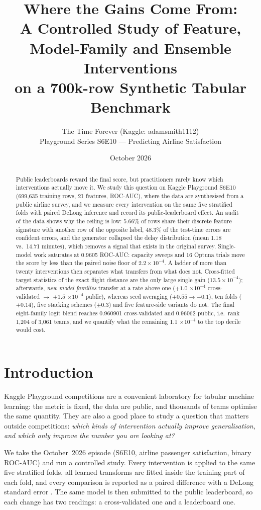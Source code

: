 \documentclass[10pt,a4paper]{article}
\title{\vspace{-1.2cm}\bfseries Where the Gains Come From:\\[2pt]
\large A Controlled Study of Feature, Model-Family and Ensemble Interventions\\
on a 700k-row Synthetic Tabular Benchmark}
\author{The Time Forever \quad (Kaggle: \textsf{adamsmith1112})\\[2pt]
\small Playground Series S6E10 --- Predicting Airline Satisfaction}
\date{October 2026}
\newcommand{\auc}{ROC-AUC}
\newcommand{\dlt}[1]{$#1\times10^{-4}$}
\begin{document}
\maketitle

\begin{abstract}
\noindent
Public leaderboards reward the final score, but practitioners rarely know which
interventions actually move it. We study this question on Kaggle Playground S6E10
(699{,}635 training rows, 21 features, \auc{}), where the data are synthesised from a
public airline survey, and we measure every intervention on the same five stratified folds
with paired DeLong inference and record its public-leaderboard effect. An audit of the data
shows why the ceiling is low: 5.66\% of rows share their discrete feature signature with
another row of the opposite label, 48.3\% of the test-time errors are confident errors, and
the generator collapsed the delay distribution (mean 1.18 vs.\ 14.71 minutes), which removes a
signal that exists in the original survey. Single-model work saturates at 0.9605
\auc{}: capacity sweeps and 16 Optuna trials move the score by less than the paired noise
floor of \dlt{2.2}. A ladder of more than twenty interventions then separates what transfers from what does
not. Cross-fitted target statistics of the exact flight distance are the only large single
gain (\dlt{13.5}); afterwards, \emph{new model families} transfer at a rate above one
($+1.0$ \dlt{} cross-validated $\to$ $+1.5$ \dlt{} public), whereas seed averaging
($+0.55 \to +0.1$), ten folds ($+0.14$), five stacking schemes ($\pm 0.3$) and five
feature-side variants do not. The final eight-family logit blend reaches 0.960901
cross-validated and 0.96062 public, i.e.\ rank 1{,}204 of 3{,}061 teams, and we quantify what
the remaining 1.1 \dlt{} to the top decile would cost.
\end{abstract}

\section{Introduction}

Kaggle Playground competitions are a convenient laboratory for tabular machine learning:
the metric is fixed, the data are public, and thousands of teams optimise the same quantity.
They are also a good place to study a question that matters outside competitions:
\emph{which kinds of intervention actually improve generalisation, and which only improve the
number you are looking at?}

We take the October~2026 episode (S6E10, airline passenger satisfaction, binary \auc{}) and run
a controlled study. Every intervention is applied to the same five stratified folds, all
learned transforms are fitted inside the training part of each fold, and every comparison is
reported as a paired difference with a DeLong standard error \citep{delong1988}. The same model
is then submitted to the public leaderboard, so each change has two readings: a cross-validated
one and a leaderboard one.
\end{document}
